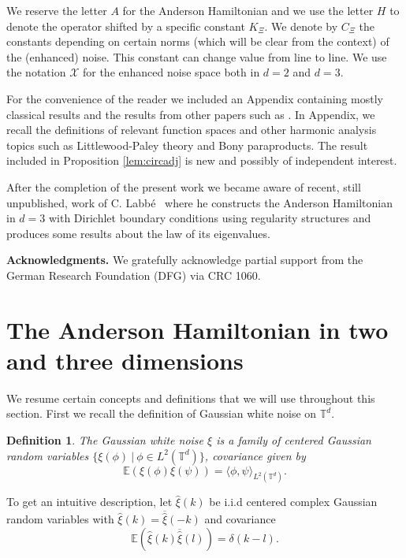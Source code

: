 \documentclass[11pt, oneside]{article}   	%
\newtheorem{definition}[theorem]{Definition}
\begin{document}
We reserve the letter $A$ for the Anderson Hamiltonian and we use the letter $H$ to denote the  operator shifted by a specific constant $K_\Xi$.  We denote by $C_\Xi$  the constants depending on certain norms (which will be clear from the context) of the (enhanced) noise.  This constant can change value from line to line.  We use the notation $\mathscr{X}$ for the enhanced noise space both in $d=2$ and $d=3$.

For the convenience of the reader we included an Appendix containing mostly  classical results and the results from other papers such as \cite{allez_continuous_2015,gubinelli2015paracontrolled,gubinelli2017kpz}.  In Appendix, we recall the definitions  of relevant function spaces and other harmonic analysis topics such as Littlewood-Paley theory and Bony paraproducts.  The result included in Proposition \ref{lem:circadj} is new and possibly of independent interest.

After the completion of the present work we became aware of recent, still unpublished, work of C. Labb\'e~\cite{labbe_2018} where he constructs the Anderson Hamiltonian in $d=3$ with Dirichlet boundary conditions using regularity structures and produces some results about the law of its eigenvalues. 

\bigskip

\textbf{Acknowledgments.} We gratefully acknowledge partial support  from the German Research Foundation (DFG) via CRC 1060.








\section{The Anderson Hamiltonian in two and three dimensions} \label{sec:section2}

We resume certain concepts and definitions that we will use throughout this section.  First we  recall the definition of Gaussian white noise on $\mathbb{T}^d$.

\begin{definition} \label{def:whiteNoise}
The Gaussian white noise $\xi$ is a family of centered Gaussian random variables $\{ \xi(\phi)~|~ \phi \in L^2(\mathbb{T}^d)\}$, covariance given by
\[
\mathbb{E} \left( \xi(\phi) \xi(\psi) \right) = \langle \phi, \psi \rangle_{L^2(\mathbb{T}^d)}.
\] 
\end{definition}

To get an intuitive description, let  $\hat{\xi}(k)$ be i.i.d centered complex Gaussian random variables with $\hat{\xi}(k)=\overline{\hat{\xi}}(-k)$ and covariance \[
\mathbb{E}(\hat{\xi}(k)\overline{\hat{\xi}}(l))=\delta(k-l).
\]
\end{document}
